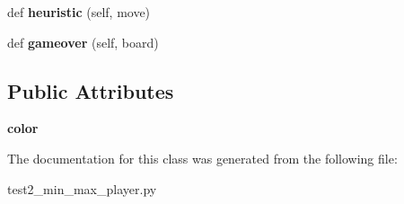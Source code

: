 \begin{DoxyCompactItemize}
\item 
\hypertarget{class_tabuleiro_othello-fork_1_1models_1_1players_1_1test2__min__max__player_1_1_minmax_player_a255e235a893dc305901985c1304a548a}{}def {\bfseries heuristic} (self, move)\label{class_tabuleiro_othello-fork_1_1models_1_1players_1_1test2__min__max__player_1_1_minmax_player_a255e235a893dc305901985c1304a548a}

\item 
\hypertarget{class_tabuleiro_othello-fork_1_1models_1_1players_1_1test2__min__max__player_1_1_minmax_player_a01a347c3fccf1e6a62ba3bfee77b864b}{}def {\bfseries gameover} (self, board)\label{class_tabuleiro_othello-fork_1_1models_1_1players_1_1test2__min__max__player_1_1_minmax_player_a01a347c3fccf1e6a62ba3bfee77b864b}

\end{DoxyCompactItemize}
\subsection*{Public Attributes}
\begin{DoxyCompactItemize}
\item 
\hypertarget{class_tabuleiro_othello-fork_1_1models_1_1players_1_1test2__min__max__player_1_1_minmax_player_a7283d479e52a553be2c89bde03d78337}{}{\bfseries color}\label{class_tabuleiro_othello-fork_1_1models_1_1players_1_1test2__min__max__player_1_1_minmax_player_a7283d479e52a553be2c89bde03d78337}

\end{DoxyCompactItemize}


The documentation for this class was generated from the following file\+:\begin{DoxyCompactItemize}
\item 
test2\+\_\+min\+\_\+max\+\_\+player.\+py\end{DoxyCompactItemize}
